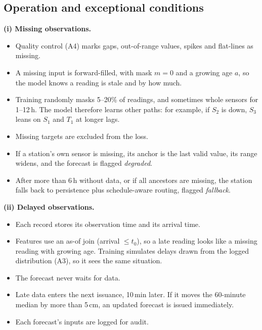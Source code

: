 \documentclass[11pt,a4paper]{article}
\begin{document}
\subsection{Operation and exceptional conditions}\label{sec:ops}
\textbf{(i) Missing observations.}
\begin{itemize}
  \item Quality control (A4) marks gaps, out-of-range values, spikes and
        flat-lines as missing.
  \item A missing input is forward-filled, with mask $m=0$ and a growing age
        $a$, so the model knows a reading is stale and by how much.
  \item Training randomly masks 5--20\% of readings, and sometimes whole sensors
        for 1--12\,h. The model therefore learns other paths: for example, if
        $S_2$ is down, $S_3$ leans on $S_1$ and $T_1$ at longer lags.
  \item Missing targets are excluded from the loss.
  \item If a station's own sensor is missing, its anchor is the last valid
        value, its range widens, and the forecast is flagged \emph{degraded}.
  \item After more than 6\,h without data, or if all ancestors are missing, the
        station falls back to persistence plus schedule-aware routing,
        flagged \emph{fallback}.
\end{itemize}

\textbf{(ii) Delayed observations.}
\begin{itemize}
  \item Each record stores its observation time and its arrival time.
  \item Features use an as-of join (arrival $\le t_0$), so a late reading looks
        like a missing reading with growing age. Training simulates delays
        drawn from the logged distribution (A3), so it sees the same
        situation.
  \item The forecast never waits for data.
  \item Late data enters the next issuance, 10\,min later. If it moves the
        60-minute median by more than 5\,cm, an updated forecast is issued
        immediately.
  \item Each forecast's inputs are logged for audit.
\end{itemize}
\end{document}
